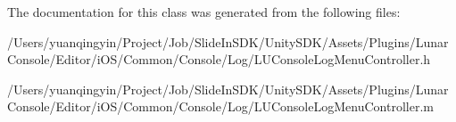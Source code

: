 The documentation for this class was generated from the following files\+:\begin{DoxyCompactItemize}
\item 
/\+Users/yuanqingyin/\+Project/\+Job/\+Slide\+In\+S\+D\+K/\+Unity\+S\+D\+K/\+Assets/\+Plugins/\+Lunar\+Console/\+Editor/i\+O\+S/\+Common/\+Console/\+Log/L\+U\+Console\+Log\+Menu\+Controller.\+h\item 
/\+Users/yuanqingyin/\+Project/\+Job/\+Slide\+In\+S\+D\+K/\+Unity\+S\+D\+K/\+Assets/\+Plugins/\+Lunar\+Console/\+Editor/i\+O\+S/\+Common/\+Console/\+Log/L\+U\+Console\+Log\+Menu\+Controller.\+m\end{DoxyCompactItemize}
